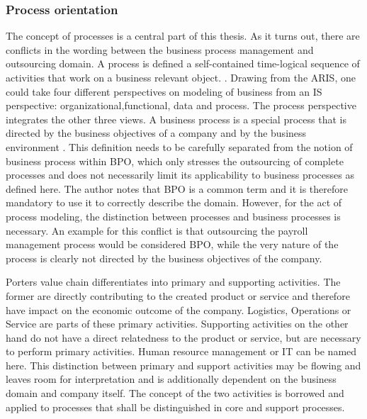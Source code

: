 		\subsubsection{Process orientation}
		\label{processorientation}
	The concept of processes is a central part of this thesis. 
	As it turns out, there are conflicts in the wording between the business process management and outsourcing domain. A process is defined a self-contained time-logical sequence of activities that work on a business relevant object. \citep[]{becker2012pm}. Drawing from the  \acrfull{ARIS}, one could take four different perspectives on modeling of business from an \acrshort{IS} perspective: organizational,functional, data and process. The process perspective integrates the other three views.
	A business process is a special process that is directed by the business objectives of a company and by the business environment \citep[]{becker2012pm}. This definition needs to be carefully separated from the notion of business process within BPO, which only stresses the outsourcing of complete processes and does not necessarily limit its applicability to business processes as defined here. The author notes that BPO is a common term and it is therefore mandatory to use it to correctly describe the domain. However, for the act of process modeling, the distinction between processes and business processes is necessary. An example for this conflict is that outsourcing the payroll management process would be considered BPO, while the very nature of the process is clearly not directed by the business objectives of the company. 
	
	Porters value chain differentiates into primary and supporting activities.  The former are directly contributing to the created product or service and therefore have impact on the economic outcome of the company. Logistics, Operations or Service are parts of these primary activities. Supporting activities on the other hand do not have a direct relatedness to the product or service, but are necessary to perform primary activities. Human resource management or IT can be named here. This distinction between primary and support activities may be flowing and leaves room for interpretation and is additionally dependent on the business domain and company itself. The concept of the two activities is borrowed and applied to processes that shall be distinguished in core and support processes. 
	 
